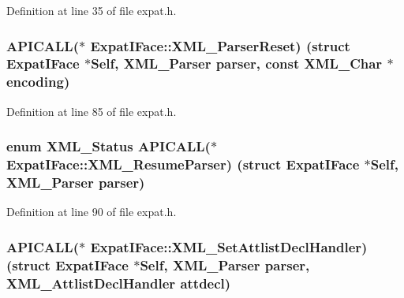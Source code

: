 Definition at line 35 of file expat.\+h.

\subsubsection[{\texorpdfstring{X\+M\+L\+\_\+\+Parser\+Reset}{XML_ParserReset}}]{ A\+P\+I\+C\+A\+LL($\ast$ Expat\+I\+Face\+::\+X\+M\+L\+\_\+\+Parser\+Reset) (struct {\bf Expat\+I\+Face} $\ast$Self, {\bf X\+M\+L\+\_\+\+Parser} parser, {\bf const} {\bf X\+M\+L\+\_\+\+Char} $\ast${\bf encoding})}\hypertarget{struct_expat_i_face_a8ef1db8d07e66d6c4a627052b8d8c840}{}\label{struct_expat_i_face_a8ef1db8d07e66d6c4a627052b8d8c840}


Definition at line 85 of file expat.\+h.

\subsubsection[{\texorpdfstring{X\+M\+L\+\_\+\+Resume\+Parser}{XML_ResumeParser}}]{\setlength{\rightskip}{0pt plus 5cm}enum {\bf X\+M\+L\+\_\+\+Status} A\+P\+I\+C\+A\+LL($\ast$ Expat\+I\+Face\+::\+X\+M\+L\+\_\+\+Resume\+Parser) (struct {\bf Expat\+I\+Face} $\ast$Self, {\bf X\+M\+L\+\_\+\+Parser} parser)}\hypertarget{struct_expat_i_face_a86d361b13c90b60b547f1598a5a0bb1a}{}\label{struct_expat_i_face_a86d361b13c90b60b547f1598a5a0bb1a}


Definition at line 90 of file expat.\+h.

\subsubsection[{\texorpdfstring{X\+M\+L\+\_\+\+Set\+Attlist\+Decl\+Handler}{XML_SetAttlistDeclHandler}}]{ A\+P\+I\+C\+A\+LL($\ast$ Expat\+I\+Face\+::\+X\+M\+L\+\_\+\+Set\+Attlist\+Decl\+Handler) (struct {\bf Expat\+I\+Face} $\ast$Self, {\bf X\+M\+L\+\_\+\+Parser} parser, {\bf X\+M\+L\+\_\+\+Attlist\+Decl\+Handler} attdecl)}\hypertarget{struct_expat_i_face_a2a04f0943e2cf75ca0798dfa3f83c4ba}{}\label{struct_expat_i_face_a2a04f0943e2cf75ca0798dfa3f83c4ba}


